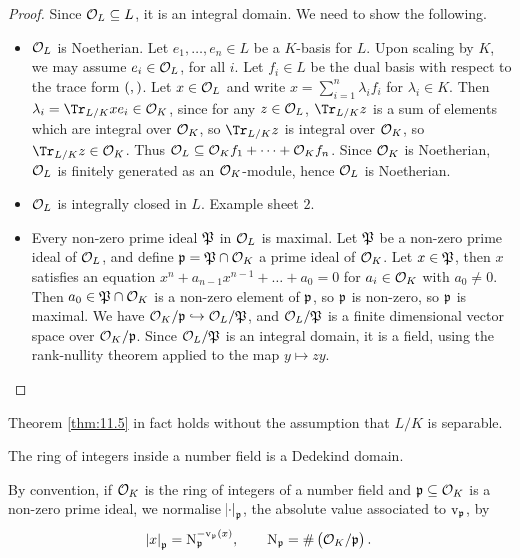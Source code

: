 \begin{proof}
Since $ \mathcal{O}_L \subseteq L $, it is an integral domain. We need to show the following.
\begin{itemize}
\item $ \mathcal{O}_L $ is Noetherian. Let $ e_1, \dots, e_n \in L $ be a $ K $-basis for $ L $. Upon scaling by $ K $, we may assume $ e_i \in \mathcal{O}_L $, for all $ i $. Let $ f_i \in L $ be the dual basis with respect to the trace form $ \br{,} $. Let $ x \in \mathcal{O}_L $ and write $ x = \sum_{i = 1}^n \lambda_if_i $ for $ \lambda_i \in K $. Then $ \lambda_i = \Tr_{L / K} xe_i \in \OOO_K $, since for any $ z \in \mathcal{O}_L $, $ \Tr_{L / K} z $ is a sum of elements which are integral over $ \mathcal{O}_K $, so $ \Tr_{L / K} z $ is integral over $ \mathcal{O}_K $, so $ \Tr_{L / K} z \in \OOO_K $. Thus $ \mathcal{O}_L \subseteq \mathcal{O}_Kf_1 + \dots + \mathcal{O}_Kf_n $. Since $ \mathcal{O}_K $ is Noetherian, $ \mathcal{O}_L $ is finitely generated as an $ \mathcal{O}_K $-module, hence $ \mathcal{O}_L $ is Noetherian.
\item $ \mathcal{O}_L $ is integrally closed in $ L $. Example sheet $ 2 $.
\item Every non-zero prime ideal $ \mathfrak{P} $ in $ \mathcal{O}_L $ is maximal. Let $ \mathfrak{P} $ be a non-zero prime ideal of $ \mathcal{O}_L $, and define $ \mathfrak{p} = \mathfrak{P} \cap \mathcal{O}_K $ a prime ideal of $ \mathcal{O}_K $. Let $ x \in \mathfrak{P} $, then $ x $ satisfies an equation $ x^n + a_{n - 1}x^{n - 1} + \dots + a_0 = 0 $ for $ a_i \in \mathcal{O}_K $ with $ a_0 \ne 0 $. Then $ a_0 \in \mathfrak{P} \cap \mathcal{O}_K $ is a non-zero element of $ \mathfrak{p} $, so $ \mathfrak{p} $ is non-zero, so $ \mathfrak{p} $ is maximal. We have $ \mathcal{O}_K / \mathfrak{p} \hookrightarrow \mathcal{O}_L / \mathfrak{P} $, and $ \mathcal{O}_L / \mathfrak{P} $ is a finite dimensional vector space over $ \mathcal{O}_K / \mathfrak{p} $. Since $ \mathcal{O}_L / \mathfrak{P} $ is an integral domain, it is a field, using the rank-nullity theorem applied to the map $ y \mapsto zy $.
\end{itemize}
\end{proof}

\begin{remark*}
Theorem \ref{thm:11.5} in fact holds without the assumption that $ L / K $ is separable.
\end{remark*}

\begin{corollary}
The ring of integers inside a number field is a Dedekind domain.
\end{corollary}

\begin{remark*}
By convention, if $ \mathcal{O}_K $ is the ring of integers of a number field and $ \mathfrak{p} \subseteq \mathcal{O}_K $ is a non-zero prime ideal, we normalise $ \abs{\cdot}_{\mathfrak{p}} $, the absolute value associated to $ \mathrm{v}_{\mathfrak{p}} $, by
$$ \abs{x}_\ppp = \N_\ppp^{-\v_\ppp\br{x}}, \qquad \N_\ppp = \#\br{\OOO_K / \ppp}. $$
\end{remark*}

